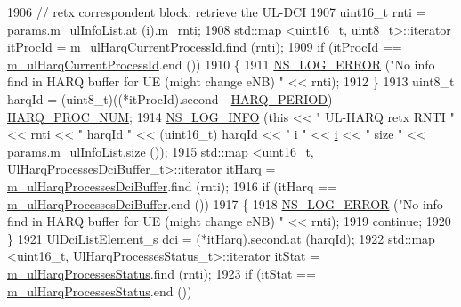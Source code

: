 \begin{DoxyCode}
1906               \textcolor{comment}{// retx correspondent block: retrieve the UL-DCI}
1907               uint16\_t rnti = params.m\_ulInfoList.at (\hyperlink{bernuolliDistribution_8m_a6f6ccfcf58b31cb6412107d9d5281426}{i}).m\_rnti;
1908               std::map <uint16\_t, uint8\_t>::iterator itProcId = 
      \hyperlink{classns3_1_1CqaFfMacScheduler_a55974c35f8b783bb902ae8676fb6ff10}{m\_ulHarqCurrentProcessId}.find (rnti);
1909               \textcolor{keywordflow}{if} (itProcId == \hyperlink{classns3_1_1CqaFfMacScheduler_a55974c35f8b783bb902ae8676fb6ff10}{m\_ulHarqCurrentProcessId}.end ())
1910                 \{
1911                   \hyperlink{group__logging_ga0261a8db1d4ac5f79417d117634fd455}{NS\_LOG\_ERROR} (\textcolor{stringliteral}{"No info find in HARQ buffer for UE (might change eNB) "} << 
      rnti);
1912                 \}
1913               uint8\_t harqId = (uint8\_t)((*itProcId).second - \hyperlink{lte-common_8h_a275321ee206f130c3ddc81fcdaa13cfd}{HARQ\_PERIOD}) %
      \hyperlink{cqa-ff-mac-scheduler_8h_a9185d8d7d2b2979181d4a7044a3d3555}{HARQ\_PROC\_NUM};
1914               \hyperlink{group__logging_gafbd73ee2cf9f26b319f49086d8e860fb}{NS\_LOG\_INFO} (\textcolor{keyword}{this} << \textcolor{stringliteral}{" UL-HARQ retx RNTI "} << rnti << \textcolor{stringliteral}{" harqId "} << (uint16\_t)
      harqId << \textcolor{stringliteral}{" i "} << \hyperlink{bernuolliDistribution_8m_a6f6ccfcf58b31cb6412107d9d5281426}{i} << \textcolor{stringliteral}{" size "}  << params.m\_ulInfoList.size ());
1915               std::map <uint16\_t, UlHarqProcessesDciBuffer\_t>::iterator itHarq = 
      \hyperlink{classns3_1_1CqaFfMacScheduler_a9af9c203c1b5fc43336988caf2294562}{m\_ulHarqProcessesDciBuffer}.find (rnti);
1916               \textcolor{keywordflow}{if} (itHarq == \hyperlink{classns3_1_1CqaFfMacScheduler_a9af9c203c1b5fc43336988caf2294562}{m\_ulHarqProcessesDciBuffer}.end ())
1917                 \{
1918                   \hyperlink{group__logging_ga0261a8db1d4ac5f79417d117634fd455}{NS\_LOG\_ERROR} (\textcolor{stringliteral}{"No info find in HARQ buffer for UE (might change eNB) "} << 
      rnti);
1919                   \textcolor{keywordflow}{continue};
1920                 \}
1921               UlDciListElement\_s dci = (*itHarq).second.at (harqId);
1922               std::map <uint16\_t, UlHarqProcessesStatus\_t>::iterator itStat = 
      \hyperlink{classns3_1_1CqaFfMacScheduler_a6dd8ea014c55132578f7c050e726f856}{m\_ulHarqProcessesStatus}.find (rnti);
1923               \textcolor{keywordflow}{if} (itStat == \hyperlink{classns3_1_1CqaFfMacScheduler_a6dd8ea014c55132578f7c050e726f856}{m\_ulHarqProcessesStatus}.end ())

\end{DoxyCode}
